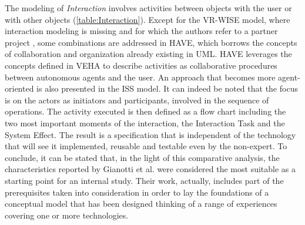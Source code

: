 The modeling of \textit{Interaction} involves activities between objects with the user or with other objects (\autoref{table:Interaction}). Except for the VR-WISE model, where interaction modeling is missing and for which the authors refer to a partner project \cite{coninx_vr-demo_2006}, some combinations are addressed in HAVE, which borrows the concepts of collaboration and organization already existing in UML. HAVE leverages the concepts defined in VEHA to describe activities as collaborative procedures between autonomous agents and the user. An approach that becomes more agent-oriented is also presented in the ISS model. It can indeed be noted that the focus is on the actors as initiators and participants, involved in the sequence of operations. The activity executed is then defined as a flow chart including the two most important moments of the interaction, the Interaction Task and the System Effect. The result is a specification that is independent of the technology that will see it implemented, reusable and testable even by the non-expert. To conclude, it can be stated that, in the light of this comparative analysis, the characteristics reported by Gianotti et al. were considered the most suitable as a starting point for an internal study. Their work, actually, includes part of the prerequisites taken into consideration in order to lay the foundations of a conceptual model that has been designed thinking of a range of experiences covering one or more technologies.